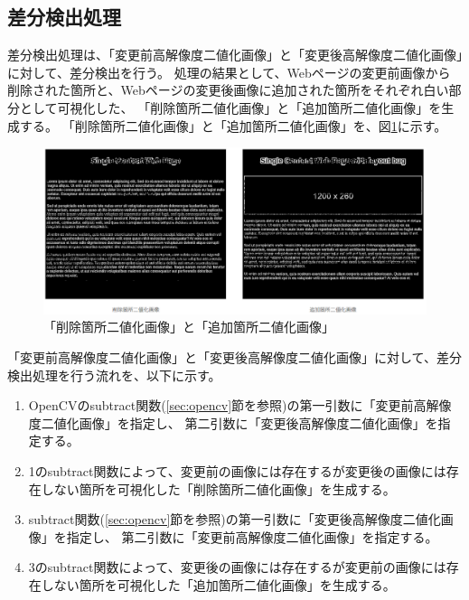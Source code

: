 \subsection{差分検出処理}\label{subsec:difference_detection_process}
差分検出処理は、「変更前高解像度二値化画像」と「変更後高解像度二値化画像」に対して、差分検出を行う。
処理の結果として、Webページの変更前画像から削除された箇所と、Webページの変更後画像に追加された箇所をそれぞれ白い部分として可視化した、
「削除箇所二値化画像」と「追加箇所二値化画像」を生成する。
「削除箇所二値化画像」と「追加箇所二値化画像」を、図\ref{fig: img_del_add_bin_bf_af}に示す。
\begin{figure}[tp]
    \begin{center}
        \includegraphics[width=1.0\columnwidth]{image/4_img_del_add_bin_bf_af.png}
        \caption{「削除箇所二値化画像」と「追加箇所二値化画像」}
        \label{fig: img_del_add_bin_bf_af}
    \end{center}
\end{figure}
「変更前高解像度二値化画像」と「変更後高解像度二値化画像」に対して、差分検出処理を行う流れを、以下に示す。
\begin{enumerate}
    \item OpenCVのsubtract関数(\ref{sec:opencv}節を参照)の第一引数に「変更前高解像度二値化画像」を指定し、
          第二引数に「変更後高解像度二値化画像」を指定する。
    \item 1のsubtract関数によって、変更前の画像には存在するが変更後の画像には存在しない箇所を可視化した「削除箇所二値化画像」を生成する。
    \item subtract関数(\ref{sec:opencv}節を参照)の第一引数に「変更後高解像度二値化画像」を指定し、
          第二引数に「変更前高解像度二値化画像」を指定する。
    \item 3のsubtract関数によって、変更後の画像には存在するが変更前の画像には存在しない箇所を可視化した「追加箇所二値化画像」を生成する。
\end{enumerate}


